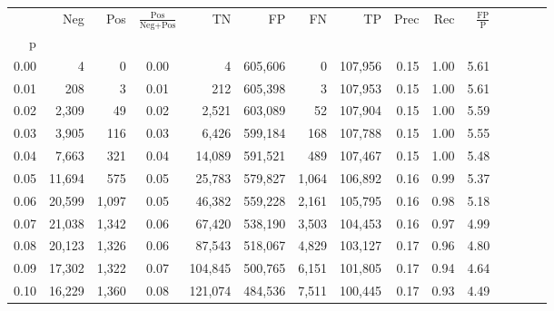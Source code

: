 \begin{tabular}{rrrcrrrrrrrrrrr}
\toprule
{} &     Neg &    Pos & $\frac{\text{Pos}}{\text{Neg}+\text{Pos}}$ &       TN &       FP &       FN &       TP &  Prec &   Rec & $\frac{\text{FP}}{\text{P}}$ \\
p    &         &        &                                            &          &          &          &          &       &       &                              \\
\midrule
0.00 &       4 &      0 &                                       0.00 &        4 &  605,606 &        0 &  107,956 &  0.15 &  1.00 &                         5.61 \\
0.01 &     208 &      3 &                                       0.01 &      212 &  605,398 &        3 &  107,953 &  0.15 &  1.00 &                         5.61 \\
0.02 &   2,309 &     49 &                                       0.02 &    2,521 &  603,089 &       52 &  107,904 &  0.15 &  1.00 &                         5.59 \\
0.03 &   3,905 &    116 &                                       0.03 &    6,426 &  599,184 &      168 &  107,788 &  0.15 &  1.00 &                         5.55 \\
0.04 &   7,663 &    321 &                                       0.04 &   14,089 &  591,521 &      489 &  107,467 &  0.15 &  1.00 &                         5.48 \\
0.05 &  11,694 &    575 &                                       0.05 &   25,783 &  579,827 &    1,064 &  106,892 &  0.16 &  0.99 &                         5.37 \\
0.06 &  20,599 &  1,097 &                                       0.05 &   46,382 &  559,228 &    2,161 &  105,795 &  0.16 &  0.98 &                         5.18 \\
0.07 &  21,038 &  1,342 &                                       0.06 &   67,420 &  538,190 &    3,503 &  104,453 &  0.16 &  0.97 &                         4.99 \\
0.08 &  20,123 &  1,326 &                                       0.06 &   87,543 &  518,067 &    4,829 &  103,127 &  0.17 &  0.96 &                         4.80 \\
0.09 &  17,302 &  1,322 &                                       0.07 &  104,845 &  500,765 &    6,151 &  101,805 &  0.17 &  0.94 &                         4.64 \\
0.10 &  16,229 &  1,360 &                                       0.08 &  121,074 &  484,536 &    7,511 &  100,445 &  0.17 &  0.93 &                         4.49 \\

\end{tabular}
